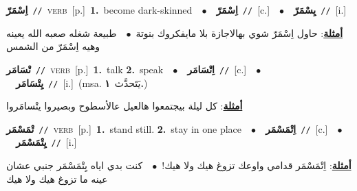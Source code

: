 \documentclass[10pt,a4paper,twoside]{article} %
\begin{document}
\begin{multicols}{2}
{\setlength\topsep{0pt}\textbf{\foreignlanguage{arabic}{اِسْمَرّ}}\ {\color{gray}\texttt{//}\color{black}}\ \textsc{verb}\ [p.]\ \textbf{1.}~become dark-skinned\ \ $\bullet$\ \ \setlength\topsep{0pt}\textbf{\foreignlanguage{arabic}{اِسْمَرّ}}\ {\color{gray}\texttt{//}\color{black}}\ [c.]\ \ $\bullet$\ \ \setlength\topsep{0pt}\textbf{\foreignlanguage{arabic}{يِسْمَرّ}}\ {\color{gray}\texttt{//}\color{black}}\ [i.]\  \begin{flushright}\color{gray}\foreignlanguage{arabic}{\textbf{\underline{\foreignlanguage{arabic}{أمثلة}}}: حاول اِسْمَرّ شوي بهالاجازة بلا مايفكروك بنوتة\ $\bullet$\ \  طبيعة شغله صعبه الله يعينه وهيه اِسْمَرّ من الشمس}\end{flushright}\color{black}} \vspace{2mm}

{\setlength\topsep{0pt}\textbf{\foreignlanguage{arabic}{تْسَامَر}}\ {\color{gray}\texttt{//}\color{black}}\ \textsc{verb}\ [p.]\ \textbf{1.}~talk  \textbf{2.}~speak\ \ $\bullet$\ \ \setlength\topsep{0pt}\textbf{\foreignlanguage{arabic}{اِتْسَامَر}}\ {\color{gray}\texttt{//}\color{black}}\ [c.]\ \ $\bullet$\ \ \setlength\topsep{0pt}\textbf{\foreignlanguage{arabic}{يِتْسَامَر}}\ {\color{gray}\texttt{//}\color{black}}\ [i.]\ \color{gray}(msa. \foreignlanguage{arabic}{يَتَحدَّث}~\foreignlanguage{arabic}{\textbf{١.}})\color{black}\  \begin{flushright}\color{gray}\foreignlanguage{arabic}{\textbf{\underline{\foreignlanguage{arabic}{أمثلة}}}: كل ليلة بيجتمعوا هالعيل عالأسطوح وبصيروا يتْسامَروا}\end{flushright}\color{black}} \vspace{2mm}

{\setlength\topsep{0pt}\textbf{\foreignlanguage{arabic}{تْمَسْمَر}}\ {\color{gray}\texttt{//}\color{black}}\ \textsc{verb}\ [p.]\ \textbf{1.}~stand still.  \textbf{2.}~stay in one place\ \ $\bullet$\ \ \setlength\topsep{0pt}\textbf{\foreignlanguage{arabic}{اِتْمَسْمَر}}\ {\color{gray}\texttt{//}\color{black}}\ [c.]\ \ $\bullet$\ \ \setlength\topsep{0pt}\textbf{\foreignlanguage{arabic}{يِتْمَسْمَر}}\ {\color{gray}\texttt{//}\color{black}}\ [i.]\  \begin{flushright}\color{gray}\foreignlanguage{arabic}{\textbf{\underline{\foreignlanguage{arabic}{أمثلة}}}: اِتْمَسْمَر قدامي واوعك تزوغ هيك ولا هيك!\ $\bullet$\ \  كنت بدي اياه يِتْمَسْمَر جنبي عشان عينه ما تزوغ هيك ولا هيك}\end{flushright}\color{black}} \vspace{2mm}


\end{multicols}
\end{document}
